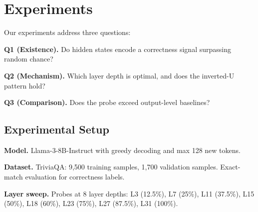\section{Experiments}
\label{sec:experiments}

Our experiments address three questions:

\textbf{Q1 (Existence).} Do hidden states encode a correctness signal surpassing random chance?

\textbf{Q2 (Mechanism).} Which layer depth is optimal, and does the inverted-U pattern hold?

\textbf{Q3 (Comparison).} Does the probe exceed output-level baselines?

\subsection{Experimental Setup}

\textbf{Model.} Llama-3-8B-Instruct with greedy decoding and max 128 new tokens.

\textbf{Dataset.} TriviaQA: 9,500 training samples, 1,700 validation samples. Exact-match evaluation for correctness labels.

\textbf{Layer sweep.} Probes at 8 layer depths: L3 (12.5\%), L7 (25\%), L11 (37.5\%), L15 (50\%), L18 (60\%), L23 (75\%), L27 (87.5\%), L31 (100\%).
